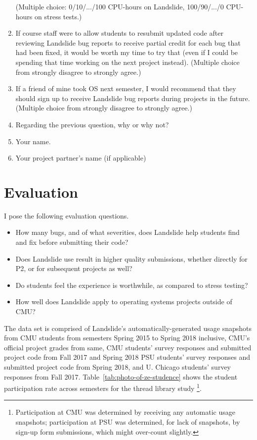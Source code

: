 \begin{enumerate}
		(Multiple choice: 0/10/.../100 CPU-hours on Landslide, 100/90/.../0 CPU-hours on stress tests.)
	\item If course staff were to allow students to resubmit updated code after reviewing Landslide bug reports to receive partial credit for each bug that had been fixed, it would be worth my time to try that (even if I could be spending that time working on the next project instead).
		(Multiple choice from strongly disagree to strongly agree.)
	\item If a friend of mine took OS next semester, I would recommend that they should sign up to receive Landslide bug reports during projects in the future.
		(Multiple choice from strongly disagree to strongly agree.)
	\item Regarding the previous question, why or why not?
	\item Your name.
	\item Your project partner's name (if applicable)
\end{enumerate}


\section{Evaluation}

I pose the following evaluation questions.

\begin{itemize}
	\item How many bugs, and of what severities, does Landslide help students find and fix before submitting their code?
	\item Does Landslide use result in higher quality submissions, whether directly for P2, or for subsequent projects as well?
	\item Do students feel the experience is worthwhile, as compared to stress testing?
	\item How well does Landslide apply to operating systems projects outside of CMU?
\end{itemize}
\vspace{1em}

The data set is comprised of Landslide's automatically-generated usage snapshots
from CMU students from semesters Spring 2015 to Spring 2018 inclusive,
CMU's official project grades from same,
CMU students' survey responses and submitted project code from Fall 2017 and Spring 2018
PSU students' survey responses and submitted project code from Spring 2018,
and U. Chicago students' survey responses from Fall 2017.
Table~\ref{tab:photo-of-ze-studence} shows the student participation rate across semesters
for the thread library study%
\footnote{
Participation at CMU was determined by receiving any automatic usage snapshots;
participation at PSU was determined, for lack of snapshots, by sign-up form submissions, which might over-count slightly.
}.

